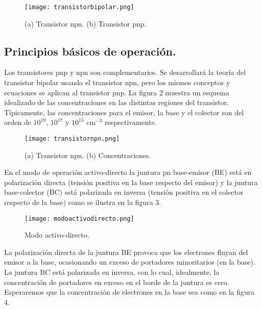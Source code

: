\documentclass[12pt,a4paper]{article}
\begin{document}
\begin{figure}[ht!]
\begin{center}
\texttt{[image: transistorbipolar.png]}
\caption{(a) Transistor npn. (b) Transistor pnp.}
\end{center}
\end{figure}

\subsection{Principios básicos de operación.}

Los transistores pnp y npn son complementarios. Se desarrollará la teoría del transistor bipolar usando el transistor npn, pero los mismos conceptos y ecuaciones se aplican al transistor pnp. La figura 2 muestra un esquema idealizado de las concentraciones en las distintas regiones del transistor. Típicamente, las concentraciones para el emisor, la base y el colector son del orden de $10^{19}$, $10^{17}$ y $10^{15}$ $\textrm{cm}^{-3}$ respectivamente.

\begin{figure}[ht!]
\begin{center}
\texttt{[image: transistornpn.png]}
\caption{(a) Transistor npn. (b) Concentraciones.}
\end{center}
\end{figure}

En el modo de operación activo-directo la juntura pn base-emisor (BE) está en polarización directa (tensión positiva en la base respecto del emisor) y la juntura base-colector (BC) está polarizada en inversa (tensión positiva en el colector respecto de la base) como se ilustra en la figura 3.

\begin{figure}[ht!]
\begin{center}
\texttt{[image: modoactivodirecto.png]}
\caption{Modo activo-directo.}
\end{center}
\end{figure}

La polarización directa de la juntura BE provoca que los electrones fluyan del emisor a la base, ocasionando un exceso de portadores minoritarios (en la base). La juntura BC está polarizada en inversa, con lo cual, idealmente, la concentración de portadores en exceso en el borde de la juntura es cero. Esperaremos que la concentración de electrones en la base sea como en la figura 4.
\end{document}
